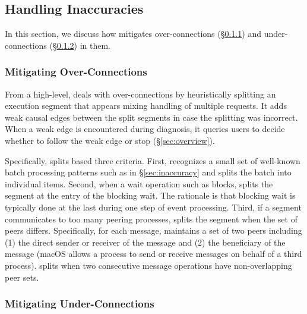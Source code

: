 \subsection{Handling Inaccuracies}

In this section, 
we discuss how \xxx mitigates
over-connections (\S\ref{subsec:fix-over}) and under-connections
(\S\ref{subsec:fix-under}) in them.

\subsubsection{Mitigating Over-Connections}\label{subsec:fix-over}

From a high-level, \xxx deals with over-connections by heuristically
splitting an execution segment that appears mixing handling of multiple
requests. It adds weak causal edges between the split segments in case
the splitting was incorrect. When a weak edge is encountered during
diagnosis, it queries users to decide whether to follow the weak edge
or stop (\S\ref{sec:overview}).

Specifically, \xxx splits based three criteria.  First, \xxx recognizes a
small set of well-known batch processing patterns such as
 in \S\ref{sec:inaccuracy} and splits the
batch into individual items.  Second, when a wait operation such as
 blocks, \xxx splits the segment at the entry of the blocking
wait.  The rationale is that blocking wait is typically done at the last
during one step of event processing.  Third, if a segment communicates to
too many peering processes, \xxx splits the segment when the set of peers
differs.  Specifically, for each message, \xxx maintains a set of two
peers including (1) the direct sender or receiver of the message and (2)
the beneficiary of the message (macOS allows a process to send or receive
messages on behalf of a third process).  \xxx splits when two consecutive
message operations have non-overlapping peer sets.

\subsubsection{Mitigating Under-Connections}\label{subsec:fix-under}

